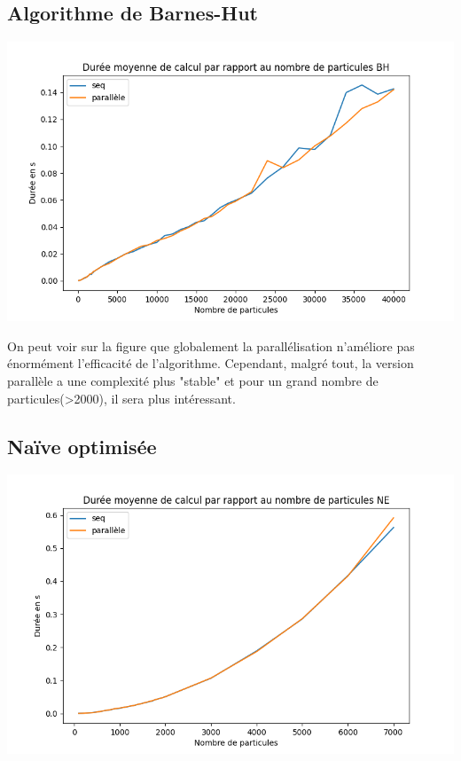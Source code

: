 \subsection{Algorithme de Barnes-Hut}
\begin{center}
\includegraphics[scale=0.6]{./resultats/comparison_BH.png}
\label{figbh}
\end{center}

On peut voir sur la figure que globalement la parallélisation n'améliore pas énormément l'efficacité de l'algorithme. Cependant, malgré tout, la version parallèle a une complexité plus "stable" et pour un grand nombre de particules(>2000), il sera plus intéressant.

\subsection{Naïve optimisée}
\begin{center}
\includegraphics[scale=0.6]{./resultats/comparison_NE.png}
\label{figbh}
\end{center}

